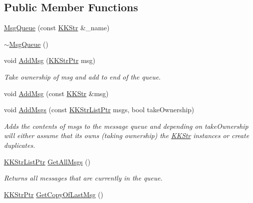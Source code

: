 \subsection*{Public Member Functions}
\begin{DoxyCompactItemize}
\item 
\hyperlink{class_k_k_b_1_1_msg_queue_aa6d7b73f9d84b27b1735c5964dea0595}{Msg\+Queue} (const \hyperlink{class_k_k_b_1_1_k_k_str}{K\+K\+Str} \&\+\_\+name)
\item 
\hyperlink{class_k_k_b_1_1_msg_queue_a04c1aca750c66393d3949d0b2aedc01c}{$\sim$\+Msg\+Queue} ()
\item 
void \hyperlink{class_k_k_b_1_1_msg_queue_a4d7d0adcf4f06a7afc6c8187a20bf95c}{Add\+Msg} (\hyperlink{namespace_k_k_b_a9adbef5a6b3be0867f5570df2a08f388}{K\+K\+Str\+Ptr} msg)
\begin{DoxyCompactList}\small\item\em Take ownership of \textquotesingle{}msg\textquotesingle{} and add to end of the queue. \end{DoxyCompactList}\item 
void \hyperlink{class_k_k_b_1_1_msg_queue_ac1356aec06472120e670bf39d6fdf91c}{Add\+Msg} (const \hyperlink{class_k_k_b_1_1_k_k_str}{K\+K\+Str} \&msg)
\item 
void \hyperlink{class_k_k_b_1_1_msg_queue_a7adf4ff13ee1e639140f7d717c7bd265}{Add\+Msgs} (const \hyperlink{namespace_k_k_b_a8f5f50672f37857425120831223888aa}{K\+K\+Str\+List\+Ptr} msgs, bool take\+Ownership)
\begin{DoxyCompactList}\small\item\em Adds the contents of \textquotesingle{}msgs\textquotesingle{} to the message queue and depending on \textquotesingle{}take\+Ownership\textquotesingle{} will either assume that its owns (taking ownership) the \hyperlink{class_k_k_b_1_1_k_k_str}{K\+K\+Str} instances or create duplicates. \end{DoxyCompactList}\item 
\hyperlink{namespace_k_k_b_a8f5f50672f37857425120831223888aa}{K\+K\+Str\+List\+Ptr} \hyperlink{class_k_k_b_1_1_msg_queue_ac0ba20e6b9f343c846f91233b8df082c}{Get\+All\+Msgs} ()
\begin{DoxyCompactList}\small\item\em Returns all messages that are currently in the queue. \end{DoxyCompactList}\item 
\hyperlink{namespace_k_k_b_a9adbef5a6b3be0867f5570df2a08f388}{K\+K\+Str\+Ptr} \hyperlink{class_k_k_b_1_1_msg_queue_aa010dbbc7fffe4ff07407d884c7a0f5e}{Get\+Copy\+Of\+Last\+Msg} ()

\end{DoxyCompactItemize}
